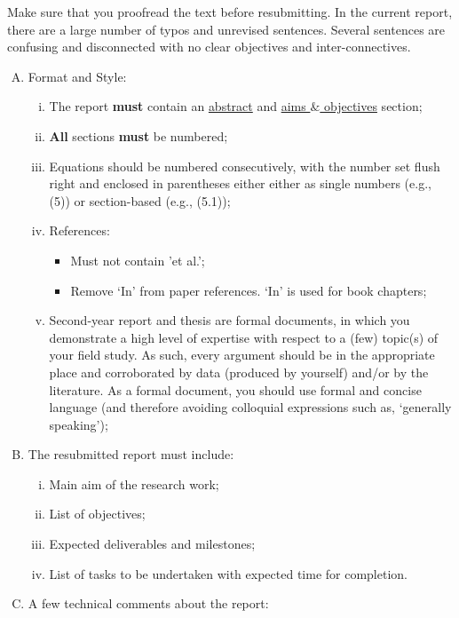 \documentclass[14pt,twoside]{report}
\begin{document}
Make sure that you proofread the text before resubmitting. In the current report, there are a large number of typos and unrevised sentences. Several sentences are confusing and disconnected with no clear objectives and inter-connectives.

\begin{enumerate}[A.]
%
   \item Format and Style:
        \begin{enumerate}[i)]
           \item The report {\bf must} contain an \underline{abstract} and  \underline{aims $\&$ objectives} section;
           \item {\bf All} sections {\bf must} be numbered;
           \item Equations should be numbered consecutively, with the number set flush right and enclosed in parentheses either either as single numbers (e.g., (5)) or section-based (e.g., (5.1));
           \item References: 
              \begin{itemize}
                  \item Must not contain 'et al.';
                  \item Remove `In' from paper references. `In' is used for book chapters;
              \end{itemize} 
           \item Second-year report and thesis are formal documents, in which you demonstrate a high level of expertise with respect to a (few) topic(s) of your field study. As such, every argument should be in the appropriate place and corroborated by data (produced by yourself) and/or by the literature. As a formal document, you should use formal and concise language (and therefore avoiding colloquial expressions such as, `generally speaking');
        \end{enumerate}
%
   \item The resubmitted report must include:
       \begin{enumerate}[i)]
           \item Main aim of the research work;
           \item List of objectives; 
           \item Expected deliverables and milestones;
           \item List of tasks to be undertaken with expected time for completion.
       \end{enumerate}
%
   \item A few technical comments about the report: 

\end{enumerate}
\end{document}
